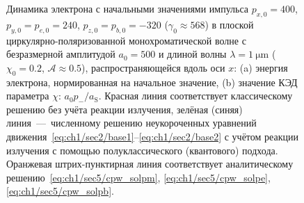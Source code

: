 \begin{comment}
    Однако найденное нами решение становится всё более точным с ростом $\varphi$, что продемонстрировано на Рис.~\ref{fig:ch1/sec5/cpw}.
    
    Таким образом итоговое решение уравнений движения электрона в циркулярно-поляризованной монохроматической плоской волне с начальными условиями $p(0) = a_0$, $\psi_0 = \pi/2$ имеют следующий вид
    \begin{gather}
        \label{eq:ch1/sec5/cpw_solpm}
        p_- = \frac{p_{-,0}}{1 + \mathcal{A}\varphi}, \\
        \label{eq:ch1/sec5/cpw_solp}
        p = a_0 \left(1 - \frac{\mathcal{A}\sin\varphi}{1 + \mathcal{A}\varphi}\right), \\
        \label{eq:ch1/sec5/cpw_solpsi}
        \psi = -\frac{\pi}{2} - \frac{\mathcal{A}(1 - \cos\varphi)}{1 + \mathcal{A}\varphi}, \\
        \label{eq:ch1/sec5/cpw_solg}
        \gamma = \frac{1}{2} \left( \frac{(1+p^2)\left( 1 + \mathcal{A}\varphi \right)}{p_{-,0}} + \frac{p_{-,0}}{1 + \mathcal{A}\varphi} \right).
    \end{gather}
    Решение с произвольными начальными условиями может быть получено с помощью соответствующего преобразования Лоренца, которое не приводится в силу громоздкости.
\end{comment}
\begin{figure}[ht]
    \caption[Динамика электрона в циркулярно-поляризованной монохроматической плоской волне]{
    Динамика электрона с начальными значениями импульса $p_{x, 0} = 400$, $p_{y, 0} = p_{e, 0} = 240$, $p_{z, 0} = p_{b,0} = -320$ ($\gamma_0 \approx 568$) в плоской циркулярно-поляризованной монохроматической волне с безразмерной амплитудой $a_0 = 500$ и длиной волны $\lambda = \SI{1}{\um}$ ($\chi_0 = 0.2$, $\mathcal{A}\approx 0.5$), распространяющейся вдоль оси $x$: (a) энергия электрона, нормированная на начальное значение, (b) значение КЭД параметра $\chi$: $a_0 p_-/a_\mathrm{S}$. Красная линия соответствует классическому решению без учёта реакции излучения, зелёная (синяя) линия~---~численному решению неукороченных уравнений движения~\eqref{eq:ch1/sec2/base1}--\eqref{eq:ch1/sec2/base2} с учётом реакции излучения с помощью полуклассического (квантового) подхода. Оранжевая штрих-пунктирная линия соответствует аналитическому решению~\eqref{eq:ch1/sec5/cpw_solpm}, \eqref{eq:ch1/sec5/cpw_solpe}, \eqref{eq:ch1/sec5/cpw_solpb}.}
    \label{fig:ch1/sec5/cpw}
\end{figure}

